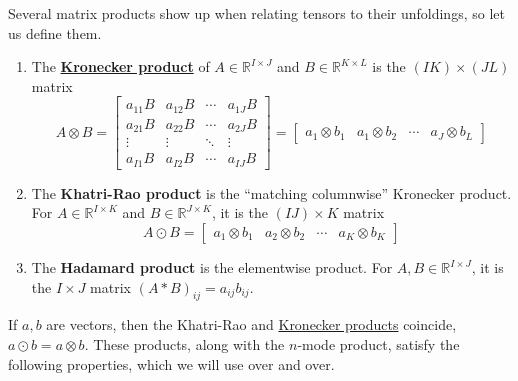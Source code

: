  Several matrix products show up when relating tensors to their unfoldings, so let us define them.

  \begin{definition}
    \label{def:kronecker-khatri-rao-hadamard-products}
    \begin{enumerate}
      \item The \textbf{\hyperref[lin-def:kronecker-product]{Kronecker product}} of $A \in \mathbb{R}^{I \times J}$ and $B \in \mathbb{R}^{K \times L}$ is the $(IK) \times (JL)$ matrix
      \begin{equation}
        A \otimes B = \begin{bmatrix} a_{11} B & a_{12} B & \cdots & a_{1J} B \\ a_{21} B & a_{22} B & \cdots & a_{2J} B \\ \vdots & \vdots & \ddots & \vdots \\ a_{I1} B & a_{I2} B & \cdots & a_{IJ} B \end{bmatrix} = \begin{bmatrix} a_1 \otimes b_1 & a_1 \otimes b_2 & \cdots & a_J \otimes b_L \end{bmatrix}
      \end{equation}

      \item The \textbf{Khatri-Rao product} is the ``matching columnwise'' Kronecker product. For $A \in \mathbb{R}^{I \times K}$ and $B \in \mathbb{R}^{J \times K}$, it is the $(IJ) \times K$ matrix
      \begin{equation}
        A \odot B = \begin{bmatrix} a_1 \otimes b_1 & a_2 \otimes b_2 & \cdots & a_K \otimes b_K \end{bmatrix}
      \end{equation}

      \item The \textbf{Hadamard product} is the elementwise product. For $A, B \in \mathbb{R}^{I \times J}$, it is the $I \times J$ matrix $(A * B)_{ij} = a_{ij} b_{ij}$.
    \end{enumerate}
  \end{definition}

  If $a, b$ are vectors, then the Khatri-Rao and \hyperref[lin-def:kronecker-product]{Kronecker products} coincide, $a \odot b = a \otimes b$. These products, along with the $n$-mode product, satisfy the following properties, which we will use over and over.

